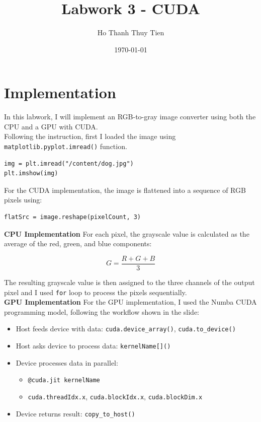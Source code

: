 \documentclass{article}
\title{Labwork 3 - CUDA}
\author{Ho Thanh Thuy Tien}
\date{\today}
\begin{document}
\maketitle

\section{Implementation}
In this labwork, I will implement an RGB-to-gray image converter using both the CPU and a GPU with CUDA.\\

Following the instruction, first I loaded the image using \texttt{matplotlib.pyplot.imread()} function.

\begin{verbatim}
img = plt.imread("/content/dog.jpg")
plt.imshow(img)
\end{verbatim}

For the CUDA implementation, the image is flattened into a sequence
of RGB pixels using:

\begin{verbatim}
flatSrc = image.reshape(pixelCount, 3)
\end{verbatim}


\textbf{CPU Implementation}
For each pixel, the grayscale value is calculated as the average of the red, green, and blue components:

\begin{equation}
    G = \frac{R + G + B}{3}
\end{equation}

The resulting grayscale value is then assigned to the three channels
of the output pixel and I used \texttt{for} loop to process the pixels sequentially.\\

\textbf{GPU Implementation} For the GPU implementation, I used the Numba CUDA programming model, following the workflow shown in the slide:

\begin{itemize}
    \item Host feeds device with data: \texttt{cuda.device\_array()}, \texttt{cuda.to\_device()}
    \item Host asks device to process data: \texttt{kernelName[]()}
    \item Device processes data in parallel:
    \begin{itemize}
        \item \texttt{@cuda.jit kernelName}
        \item \texttt{cuda.threadIdx.x}, \texttt{cuda.blockIdx.x}, \texttt{cuda.blockDim.x}
    \end{itemize}
    \item Device returns result: \texttt{copy\_to\_host()}
\end{itemize}
\end{document}
